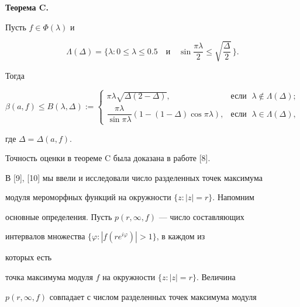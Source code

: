 {\bf Теорема C.} {\it 


Пусть $f\in\Phi(\lambda)$ и 


$$ 


\Lambda(\Delta)=\bigg\{\lambda:0\le\lambda\le0.5 


\quad\text{и}\quad 


\sin\frac{\pi\lambda}{2}\le 


\sqrt{\frac{\Delta}{2}}\,\bigg\}. 


$$ 


Тогда 


\begin{equation} 


\beta(a,f)\le B(\lambda,\Delta):= 


\begin{cases} 


\pi\lambda\sqrt{\Delta(2-\Delta)},&\text{если }\; 


\lambda\notin\Lambda(\Delta);\\[3mm] 


\dfrac{\pi\lambda}{\sin\pi\lambda}(1-(1-\Delta) 


\cos\pi\lambda),&\text{если }\;\lambda\in\Lambda(\Delta), 


\end{cases} 


\end{equation} 


где $\Delta=\Delta(a,f)$. 


} 


\medskip 


 


Точность оценки в теореме C была доказана в работе [8]. 


 


В [9], [10] мы ввели и исследовали число разделенных точек максимума 


модуля мероморфных функций на окружности $\{z:|z|=r\}$. Напомним 


основные определения. Пусть $p(r,\infty,f)$ --- число составляющих 


интервалов множества $\{\varphi:|f(r e^{i\varphi})|>1\}$, в каждом из 


которых есть 


точка максимума модуля $f$ на окружности $\{z:|z|=r\}$. Величина 


$p(r,\infty,f)$ совпадает с числом разделенных точек максимума модуля 


